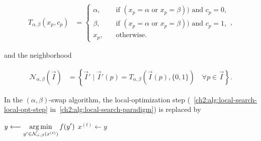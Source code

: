 \begin{align*}
	T_{\alpha,\beta}(x_p,c_p) &= \left\{ \begin{array}{rl}
		\alpha,& \quad \text{if } ( x_p=\alpha \text{ or } x_p=\beta) ) \text{ and } c_p=0,\\[1em]
		\beta,& \quad \text{if } ( x_p=\alpha \text{ or } x_p=\beta) ) \text{ and } c_p=1,\\[1em]
		x_p,& \quad \text{otherwise}.
	\end{array}\right. ,
\end{align*}

and the neighborhood

\begin{align*}
\mathcal{N}_{\alpha,\beta}(\vec{I}) &= \left\{ \vec{I}' \; | \; \vec{I}'(p) = T_{\alpha,\beta}(\vec{I}(p),\{0,1\}) \quad \forall p \in \vec{I} \right\}.
\end{align*}


In the $(\alpha,\beta)$-swap algorithm, the local-optimization step (~\cref{ch2:alg:local-search-local-opt-step} in~\cref{ch2:alg:local-search-paradigm}) is replaced by

\begin{algorithm}[H]
  \BlankLine
  
 	{
	 	$y \longleftarrow \displaystyle \operatorname*{arg\,min}_{ y' \in \mathcal{N}_{\alpha,\beta}(x^{(t)})} f(y')$\;
	 	{
	 		$x^{(t)} \longleftarrow y$\;
	 	}
 	}
 	
 \BlankLine
\end{algorithm}

